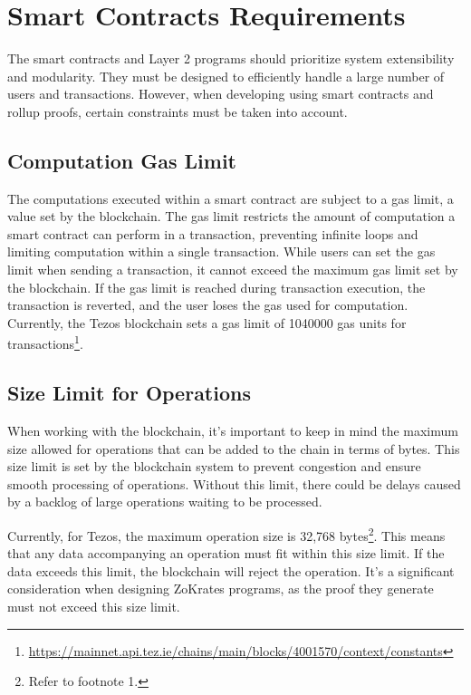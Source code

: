 \section{Smart Contracts Requirements \label{sec:3_smartContractsRequirements}}

The smart contracts and Layer 2 programs should prioritize system extensibility and modularity. They must be designed to efficiently handle a large number of users and transactions. However, when developing using smart contracts and rollup proofs, certain constraints must be taken into account.

\subsection{Computation Gas Limit \label{subsec:gasLimit}}

The computations executed within a smart contract are subject to a gas limit, a value set by the blockchain. The gas limit restricts the amount of computation a smart contract can perform in a transaction, preventing infinite loops and limiting computation within a single transaction. While users can set the gas limit when sending a transaction, it cannot exceed the maximum gas limit set by the blockchain. If the gas limit is reached during transaction execution, the transaction is reverted, and the user loses the gas used for computation. Currently, the Tezos blockchain sets a gas limit of 1040000 gas units for transactions\footnote{\url{https://mainnet.api.tez.ie/chains/main/blocks/4001570/context/constants}}.

\subsection{Size Limit for Operations}

When working with the blockchain, it's important to keep in mind the maximum size allowed for operations that can be added to the chain in terms of bytes. This size limit is set by the blockchain system to prevent congestion and ensure smooth processing of operations. Without this limit, there could be delays caused by a backlog of large operations waiting to be processed.

Currently, for Tezos, the maximum operation size is 32,768 bytes\footnote{Refer to footnote 1.}. This means that any data accompanying an operation must fit within this size limit. If the data exceeds this limit, the blockchain will reject the operation. It's a significant consideration when designing ZoKrates programs, as the proof they generate must not exceed this size limit.

